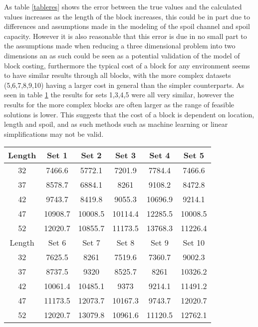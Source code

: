 As table \ref{tableres} shows the error between the true values and the calculated values increases as the length of the block increases, this could be in part due to differences and assumptions made in the modeling of the spoil channel and spoil capacity. However it is also reasonable that this error is due in no small part to the assumptions made when reducing a three dimensional problem into two dimensions an as such could be seen as a potential validation of the model of block costing, furthermore the typical cost of a block for any environment seems to have similar results through all blocks, with the more complex datasets (5,6,7,8,9,10) having a larger cost in general than the simpler counterparts. As seen in table \ref{RESMIP} the results for sets 1,3,4,5 were all very similar, however the results for the more complex blocks are often larger as the range of feasible solutions is lower. This suggests that the cost of a block is dependent on location, length and spoil, and as such methods such as machine learning or linear simplifications may not be valid. 
\begin{table}
\begin{tabular}{ | c | c | c | c | c | c |}
\hline
\label{RESMIP}
	Length & Set 1 & Set 2 & Set 3 & Set 4 & Set 5  \\ \hline
	32 & 7466.6 & 5772.1 & 7201.9 & 7784.4 & 7466.6  \\ \hline
	37 & 8578.7 & 6884.1 & 8261 & 9108.2 & 8472.8  \\ \hline
	42 & 9743.7 & 8419.8 & 9055.3 & 10696.9 & 9214.1 \\ \hline
	47 & 10908.7 & 10008.5 & 10114.4 & 12285.5 & 10008.5 \\ \hline
	52 & 12020.7 & 10855.7 & 11173.5 & 13768.3 & 11226.4 \\ \hline
	\hline
	Length & Set 6 & Set 7 & Set 8 & Set 9 & Set 10  \\ \hline
	32 & 7625.5 & 8261 & 7519.6 & 7360.7 & 9002.3  \\ \hline
	37& 8737.5 & 9320 & 8525.7& 8261 & 10326.2  \\ \hline
	42 & 10061.4 & 10485.1 & 9373 & 9214.1 & 11491.2 \\ \hline
	47 & 11173.5 & 12073.7 & 10167.3 & 9743.7& 12020.7 \\ \hline
	52 & 12020.7 & 13079.8 & 10961.6 & 11120.5 & 12762.1  \\ \hline

\end{tabular}
\end{table}
